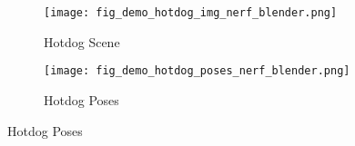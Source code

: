 \begin{figure}[H]
    \centering
    \begin{subfigure}{0.48\linewidth}
        \texttt{[image: fig\_demo\_hotdog\_img\_nerf\_blender.png]}
        \caption{Hotdog Scene}
    \end{subfigure}
    \begin{subfigure}{0.48\linewidth}
        \texttt{[image: fig\_demo\_hotdog\_poses\_nerf\_blender.png]}
        \caption{Hotdog Poses}
    \end{subfigure}
    \label{fig:dataset_nerf_blender_hotdog}
\end{figure}
